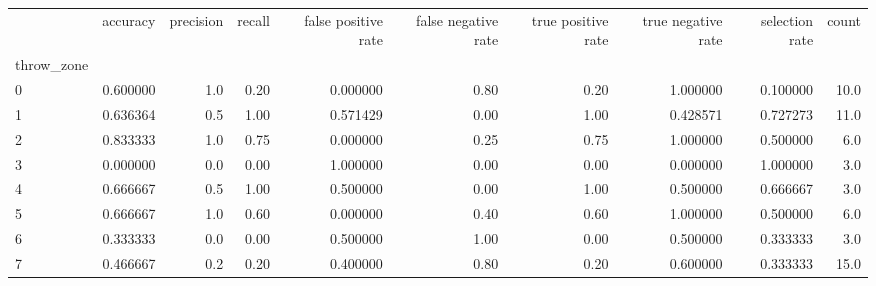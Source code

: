 \begin{tabular}{lrrrrrrrrr}
\toprule
{} &  accuracy &  precision &  recall &  false positive rate &  false negative rate &  true positive rate &  true negative rate &  selection rate &  count \\
throw\_zone &           &            &         &                      &                      &                     &                     &                 &        \\
\midrule
0          &  0.600000 &        1.0 &    0.20 &             0.000000 &                 0.80 &                0.20 &            1.000000 &        0.100000 &   10.0 \\
1          &  0.636364 &        0.5 &    1.00 &             0.571429 &                 0.00 &                1.00 &            0.428571 &        0.727273 &   11.0 \\
2          &  0.833333 &        1.0 &    0.75 &             0.000000 &                 0.25 &                0.75 &            1.000000 &        0.500000 &    6.0 \\
3          &  0.000000 &        0.0 &    0.00 &             1.000000 &                 0.00 &                0.00 &            0.000000 &        1.000000 &    3.0 \\
4          &  0.666667 &        0.5 &    1.00 &             0.500000 &                 0.00 &                1.00 &            0.500000 &        0.666667 &    3.0 \\
5          &  0.666667 &        1.0 &    0.60 &             0.000000 &                 0.40 &                0.60 &            1.000000 &        0.500000 &    6.0 \\
6          &  0.333333 &        0.0 &    0.00 &             0.500000 &                 1.00 &                0.00 &            0.500000 &        0.333333 &    3.0 \\
7          &  0.466667 &        0.2 &    0.20 &             0.400000 &                 0.80 &                0.20 &            0.600000 &        0.333333 &   15.0 \\
\bottomrule
\end{tabular}
